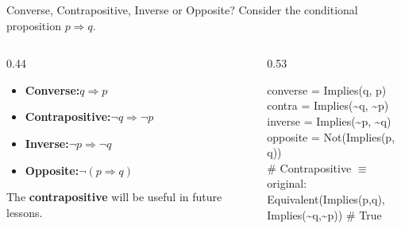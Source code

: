 \documentclass[aspectratio=169]{beamer}
\begin{document}
\begin{frame}[t]{Converse, Contrapositive, Inverse or Opposite?}
  Consider the conditional proposition $p \Rightarrow q$.
  \vspace{0.4em}

  \begin{columns}[T,onlytextwidth]
    \begin{column}{0.44\textwidth}
      \begin{itemize}\setlength\itemsep{0.45em}
        \item \textbf{Converse:}\quad $q \Rightarrow p$
        \item \textbf{Contrapositive:}\quad $\neg q \Rightarrow \neg p$
        \item \textbf{Inverse:}\quad $\neg p \Rightarrow \neg q$
        \item \textbf{Opposite:}\quad $\neg(p \Rightarrow q)$
      \end{itemize}
      \vspace{0.6em}
      The \textbf{contrapositive} will be useful in future lessons.
    \end{column}
    \begin{column}{0.53\textwidth}
      \begin{tcolorbox}[spstyle]
        converse = Implies(q, p)\\
        contra   = Implies(\textasciitilde{}q, \textasciitilde{}p)\\
        inverse  = Implies(\textasciitilde{}p, \textasciitilde{}q)\\
        opposite = Not(Implies(p, q))\\[4pt]
        \# Contrapositive $\equiv$ original:\\
        Equivalent(Implies(p,q),\\
        \quad\quad\quad\quad Implies(\textasciitilde{}q,\textasciitilde{}p))
        \# True
      \end{tcolorbox}
    \end{column}
  \end{columns}
\end{frame}
\end{document}
